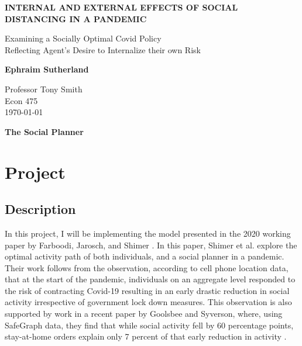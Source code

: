 \documentclass[12pt]{article}
\begin{document}
\begin{titlepage}
   \begin{center}
       \vspace*{1cm}

       \textbf{INTERNAL AND EXTERNAL EFFECTS OF SOCIAL DISTANCING IN A PANDEMIC}

       \vspace{0.5cm}
        Examining a Socially Optimal Covid Policy \\ Reflecting Agent's Desire to Internalize their own Risk
            
       \vspace{1.5cm}

       \textbf{Ephraim Sutherland}

       \vfill
            
            
       \vspace{0.8cm}

     
            
       Professor Tony Smith\\
       Econ 475\\
       \today
            
   \end{center}
\end{titlepage}

\begin{center}
	{\large \bf The Social Planner}  
\end{center}

\setcounter{page}{2}

\section{Project}
\subsection{Description}
In this project, I will be implementing the model presented in the 2020 working paper by Farboodi, Jarosch, and Shimer \autocite{shimer}. In this paper, Shimer et al. explore the optimal activity path
of both individuals, and a social planner in a pandemic. Their work follows from the observation, according to cell phone location data, that at the start of the pandemic,
individuals on an aggregate level responded to the risk
of contracting Covid-19 resulting in an early drastic reduction in social activity irrespective of government lock down measures.
This observation is also supported by work in a recent paper by Goolsbee and Syverson, where, using SafeGraph data, they find that while social activity fell by 60 
percentage points, stay-at-home orders explain only 7 percent of that early reduction in activity \autocite{goolsbee}.
\end{document}
